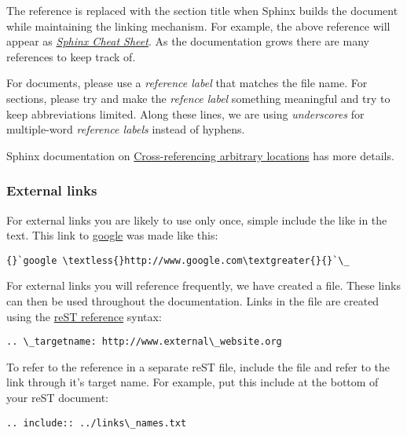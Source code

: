 \documentclass[letterpaper,10pt,openany, oneside]{sphinxmanual}
\begin{document}
The reference is replaced with the section title when Sphinx builds
the document while maintaining the linking mechanism.  For example,
the above reference will appear as {\hyperref[sample:sphinx-helpers]{\emph{Sphinx Cheat Sheet}}}.  As the
documentation grows there are many references to keep track of.

For documents, please use a \emph{reference label} that matches the file
name.  For sections, please try and make the \emph{refence label} something
meaningful and try to keep abbreviations limited.  Along these lines,
we are using \emph{underscores} for multiple-word \emph{reference labels}
instead of hyphens.

Sphinx documentation on \href{http://sphinx.pocoo.org/markup/inline.html\#cross-referencing-arbitrary-locations}{Cross-referencing arbitrary locations}
has more details.


\subsubsection{External links}
\label{sample:external-links}
For external links you are likely to use only once, simple include the
like in the text.  This link to \href{http://www.google.com}{google} was
made like this:

\begin{Verbatim}[commandchars=\\\{\}]
{}`google \textless{}http://www.google.com\textgreater{}{}`\_
\end{Verbatim}

For external links you will reference frequently, we have created a
 file.  These links can then be used throughout the
documentation.  Links in the  file are created
using the \href{http://docutils.sourceforge.net/docs/user/rst/quickref.html\#hyperlink-targets}{reST reference}
syntax:

\begin{Verbatim}[commandchars=\\\{\}]
.. \_targetname: http://www.external\_website.org
\end{Verbatim}

To refer to the reference in a separate reST file, include the
 file and refer to the link through it's target
name.  For example, put this include at the bottom of your reST
document:

\begin{Verbatim}[commandchars=\\\{\}]
.. include:: ../links\_names.txt
\end{Verbatim}
\end{document}
